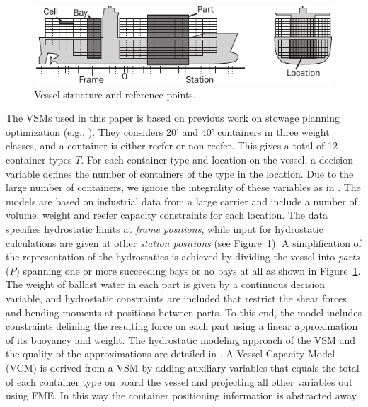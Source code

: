 \documentclass{llncs}
\begin{document}
\begin{figure}[tb]
	\centering
		\includegraphics[scale = 0.9]{figures/vessel6.pdf}
	\caption{Vessel structure and reference points.}
	\label{fig:vessel}
\end{figure}

The VSMs used in this paper is based on previous work on stowage planning optimization (e.g., \cite{pacino11,AlbertosThesis}).  
They considers 20' and 40' containers in three weight classes, and a container is either reefer or non-reefer. This gives a total of 12 container types $T$. 
For each container type and location on the vessel, a decision variable defines the number of containers of the type in the location. Due to the large number of containers, we ignore the integrality of these variables as in \cite{pacino11}. 
The models are based on industrial data from a large carrier and include a number of volume, weight and reefer capacity constraints for each location. The data specifies hydrostatic limits at \emph{frame positions}, while input for hydrostatic calculations are given at other \emph{station positions} (see Figure~\ref{fig:vessel}). A simplification of the representation of the hydrostatics is achieved by dividing the vessel into \emph{parts} ($P$) spanning one or more succeeding bays or no bays at all as shown in Figure~\ref{fig:vessel}. 
The weight of ballast water in each part is given by a continuous decision variable, and hydrostatic constraints are included that restrict the shear forces and bending moments at positions between parts. To this end, the model includes constraints defining the resulting force on each part using a linear approximation of its buoyancy and weight. The hydrostatic modeling approach of the VSM and the quality of the approximations are detailed in \cite{ICCL18}. 
%
A Vessel Capacity Model (VCM) is derived from a VSM by adding auxiliary variables that equals the total of each container type on board the vessel and projecting all other variables out using FME. In this way the container positioning information is abstracted away.
\end{document}
